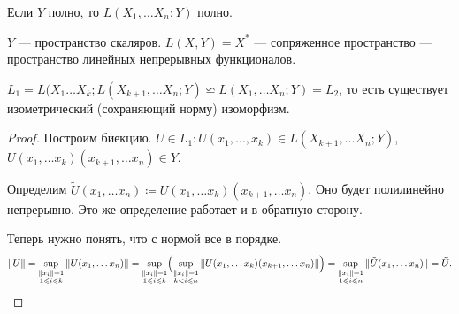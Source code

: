 \begin{thm}
    Если $ Y$ полно, то  $ L(X_1, \ldots X_n; Y) $ полно.
\end{thm}
\begin{ex}
    $ Y$ --- пространство скаляров. $ L(X, Y) = X^{*}$ --- сопряженное пространство --- пространство линейных непрерывных функционалов.
\end{ex}
\begin{thm}
    $ L_1=L(X_1 \ldots X_k; L(X_{k+1}, \ldots X_{n}; Y) \backsimeq L(X_{1}, \ldots X_n; Y) = L_2$, то есть существует изометрический (сохраняющий норму) изоморфизм.
\end{thm}
\begin{proof}
    Построим биекцию.
    $ U \in  L_1 \colon U(x_1, \ldots, x_k) \in  L(X_{k+1}, \ldots X_n;Y) $,\\
    $ U(x_1, \ldots x_k)(x_{k+1}, \ldots x_n) \in Y$.

    Определим $ \tilde U(x_1, \ldots x_n) \coloneqq  U(x_1, \ldots x_k)(x_{k+1}, \ldots x_n)$. Оно будет полилинейно непрерывно. 
Это же определение работает и в обратную сторону.

Теперь нужно понять, что с нормой все в порядке. 
\[
    \| U \| = \sup_{\substack{\| x_i \| = 1\\ 1 \le i \le  k}} \| U(x_1, \ldots x_n) \| =
    \sup_{\substack{\| x_i \|  = 1\\ 1 \le i \le k}} \Bigl(\sup _{\substack{\| x_{i} \| =1\\ k<i \le n }}  \| U(x_1, \ldots x_k)(x_{k+1}, \ldots x_n) \|\Bigr)  =
	\sup_{\substack{\| x_i \|= 1\\1 \le i \le n }} \| \tilde U(x_1, \ldots x_n) \|  = \tilde U
.\] 
\end{proof}

